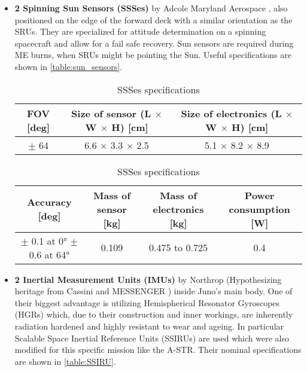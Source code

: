 \begin{itemize}
    \item \textbf{2 Spinning Sun Sensors (SSSes)} by Adcole Maryland Aerospace \cite{SSS}, also positioned on the edge of the forward deck with a similar orientation as the SRUs. They are specialized for attitude determination on a spinning spacecraft and allow for a fail safe recovery. Sun sensors are required during ME burns, when SRUs might be pointing the Sun. Useful specifications are shown in \autoref{table:sun_sensors}.
    
    \begin{table}[H]
        \renewcommand{\arraystretch}{1.3}
        \centering
        \begin{tabular}{|c|c|c|}
            \hline
            \textbf{FOV [deg]} & \textbf{Size of sensor (L $\boldsymbol{\times}$ W $\boldsymbol{\times}$ H) [cm]} & \textbf{Size of electronics (L $\boldsymbol{\times}$ W $\boldsymbol{\times}$ H) [cm]} \\
            \hline
            $\pm$ 64 & 6.6 $\times$ 3.3 $\times$ 2.5 & 5.1 $\times$ 8.2 $\times$ 8.9 \\   
            \hline
        \end{tabular}

        \vspace{5mm}

        \begin{tabular}{|c|c|c|c|}
            \hline
            \textbf{Accuracy [deg]} & \textbf{Mass of sensor [kg]} & \textbf{Mass of electronics [kg]} & \textbf{Power consumption [W]}\\
            \hline
            \makecell{$\pm$ 0.1 at 0° \\  $\pm$ 0.6 at 64°} & 0.109 & 0.475 to 0.725 & 0.4\\
            \hline
        \end{tabular}
        \caption{SSSes specifications}
        \label{table:sun_sensors}
    \end{table}
 
    
    \item \textbf{2 Inertial Measurement Units (IMUs)} by Northrop (Hypothesizing heritage from Cassini \cite{gyro_evaluation} and MESSENGER \cite{messenger_imu}) inside Juno's main body. One of their biggest advantage is utilizing Hemispherical Resonator Gyroscopes (HGRs) which, due to their construction and inner workings, are inherently radiation hardened and highly resistant to wear and ageing. In particular Scalable Space Inertial Reference Units (SSIRUs) \cite{SSIRU} are used which were also modified for this specific mission like the A-STR. Their nominal specifications are shown in \autoref{table:SSIRU}.
     

\end{itemize}
